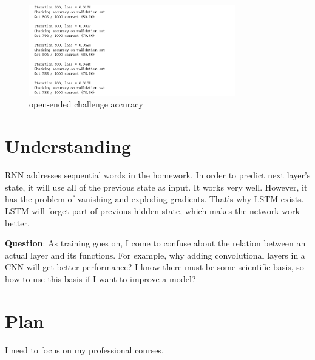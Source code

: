 \documentclass{article}
\begin{document}
\begin{figure}[htbp]
	\centering  %
	\includegraphics[width=0.8\textwidth]{9.png} 
	\caption{open-ended challenge accuracy}  %
	\label{fig:f9}   %
\end{figure}

\section{Understanding}
RNN addresses sequential words in the homework. In order to predict next layer's state, it will use all of the previous state as input. It works very well. However, it has the problem of vanishing and exploding gradients. That's why LSTM exists. LSTM will forget part of previous hidden state, which makes the network work better. 

\textbf{Question}: As training goes on, I come to confuse about the relation between an actual layer and its functions. For example, why adding convolutional layers in a CNN will get better performance? I know there must be some scientific basis, so how to use this basis if I want to improve a model?

\section{Plan}
I need to focus on my professional courses.
\end{document}
